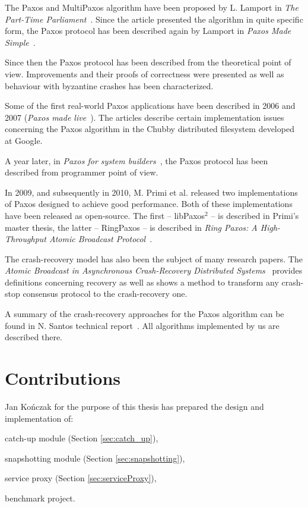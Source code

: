 The Paxos and MultiPaxos algorithm have been proposed by L. Lamport in \textit{The Part-Time Parliament}~\cite{Lam98}. Since the article presented the algorithm in quite specific form, the Paxos protocol has been described again by Lamport in \textit{Paxos Made Simple}~\cite{Lam01}.

Since then the Paxos protocol has been described from the theoretical point of view. Improvements and their proofs of correctness were presented as well as behaviour with byzantine crashes has been characterized.

Some of the first real-world Paxos applications have been described in 2006 and 2007 (\textit{Paxos made live}~\cite{CGR07}). The articles describe certain implementation issues concerning the Paxos algorithm in the Chubby distributed filesystem developed at Google.

A year later, in \textit{Paxos for system builders}~\cite{AK08}, the Paxos protocol has been described from programmer point of view.

In 2009, and subsequently in 2010, M. Primi et al. released two implementations of Paxos designed to achieve good performance. Both of these implementations have been released as open-source. The first -- libPaxos$^2$ -- is described in Primi's master thesis, the latter -- RingPaxos -- is described in \textit{Ring Paxos: A High-Throughput Atomic Broadcast Protocol}~\cite{Mar10}.

The crash-recovery model has also been the subject of many research papers. The \textit{Atomic Broadcast in Asynchronous Crash-Recovery Distributed Systems}~\cite{rodriguez2000atomic} provides definitions concerning recovery as well as shows a method to transform any crash-stop consensus protocol to the crash-recovery one.

A summary of the crash-recovery approaches for the Paxos algorithm can be found in N. Santos technical report~\cite{Nun10}. All algorithms implemented by us are described there.

\section{Contributions}

Jan Kończak for the purpose of this thesis has prepared the design and implementation of:
\begin{tightList}
  \item[\textbullet] catch-up module (Section \ref{sec:catch_up}),
  \item[\textbullet] snapshotting module (Section \ref{sec:snapshotting}),
  \item[\textbullet] service proxy  (Section \ref{sec:serviceProxy}),
  \item[\textbullet] benchmark project.
\end{tightList}

